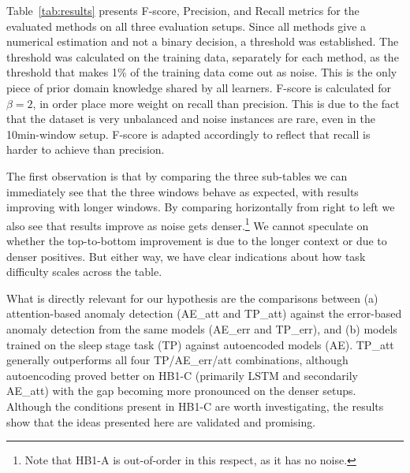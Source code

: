 \documentclass[runningheads]{llncs}
\begin{document}


Table~\ref{tab:results} presents F-score, Precision, and Recall
metrics for the evaluated methods on all three evaluation setups.
%
Since all methods give a numerical estimation and not a binary
decision, a threshold was established. The threshold was calculated
on the training data, separately for each method,
as the threshold that makes 1\% of the training data come out
as noise. This is the only piece of prior domain knowledge shared by
all learners.
%
F-score is calculated for $\beta=2$, in order place
more weight on recall than precision. This is due to the fact that
the dataset is very unbalanced and noise instances are rare, even in
the 10min-window setup. F-score is adapted accordingly to reflect
that recall is harder to achieve than precision.


The first observation is that by comparing the three sub-tables we can
immediately see that the three windows behave as expected, with
results improving with longer windows. By comparing horizontally from
right to left we also see that results improve as noise gets
denser.\footnote{Note that HB1-A is out-of-order in this respect, as
  it has no noise.}
We cannot speculate on whether the top-to-bottom improvement
is due to the longer context or due to denser positives. But either
way, we have clear indications about how task difficulty scales across
the table.

What is directly relevant for our hypothesis are the comparisons
between
(a) attention-based anomaly detection (AE\_att and TP\_att) against
the error-based anomaly detection from the same models (AE\_err and
TP\_err), and (b) models trained on the sleep stage task (TP) against
autoencoded models (AE).
TP\_att generally outperforms all four TP/AE\_err/att combinations,
although autoencoding proved better on HB1-C (primarily LSTM and
secondarily AE\_att) with the gap becoming more pronounced on the
denser setups. 
Although the conditions present in HB1-C are worth investigating,
the results show that the ideas presented here are validated and
promising.
\end{document}
